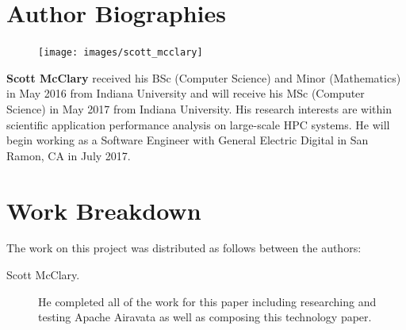 \documentclass[9pt,twocolumn,twoside]{../../styles/osajnl}
\begin{document}
\section*{Author Biographies}
\begingroup
\setlength\intextsep{0pt}
\begin{minipage}[t][3.2cm][t]{1.0\columnwidth}
  \begin{figure}
    \texttt{[image: images/scott\_mcclary]}
  \end{figure}
  \noindent
  {\bfseries Scott McClary} received his BSc (Computer Science) and
  Minor (Mathematics) in May 2016 from Indiana University and will
  receive his MSc (Computer Science) in May 2017 from Indiana
  University. His research interests are within scientific application
  performance analysis on large-scale HPC systems. He will begin
  working as a Software Engineer with General Electric Digital in San
  Ramon, CA in July 2017.
\end{minipage}
\endgroup

\section*{} %
\section*{Work Breakdown}
The work on this project was distributed as follows between the
authors:
\begin{description}
\item[Scott McClary.] He completed all of the work for this paper
  including researching and testing Apache Airavata as well as
  composing this technology paper.
\end{description}


\end{document}
